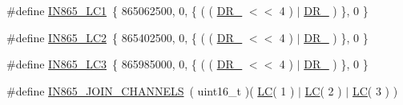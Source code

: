 \begin{DoxyCompactItemize}
\#define \mbox{\hyperlink{group___r_e_g_i_o_n_i_n865_gab2e4ff59116b5b7ea17b56379b9b1fbc}{I\+N865\+\_\+\+L\+C1}}~\{ 865062500, 0, \{ ( ( \mbox{\hyperlink{group___r_e_g_i_o_n_ga872e12c82020c02a7f70a1c6ed1375df}{D\+R\+\_}} $<$$<$ 4 ) $\vert$ \mbox{\hyperlink{group___r_e_g_i_o_n_ga6c4ef966b4f3d5eb7597b087f2b97095}{D\+R\+\_}} ) \}, 0 \}
\item 
\#define \mbox{\hyperlink{group___r_e_g_i_o_n_i_n865_ga737c986f456a7cc50b7efcbae64da6a0}{I\+N865\+\_\+\+L\+C2}}~\{ 865402500, 0, \{ ( ( \mbox{\hyperlink{group___r_e_g_i_o_n_ga872e12c82020c02a7f70a1c6ed1375df}{D\+R\+\_}} $<$$<$ 4 ) $\vert$ \mbox{\hyperlink{group___r_e_g_i_o_n_ga6c4ef966b4f3d5eb7597b087f2b97095}{D\+R\+\_}} ) \}, 0 \}
\item 
\#define \mbox{\hyperlink{group___r_e_g_i_o_n_i_n865_ga6808f21aa6b28f6d31d32bc44c3ee52a}{I\+N865\+\_\+\+L\+C3}}~\{ 865985000, 0, \{ ( ( \mbox{\hyperlink{group___r_e_g_i_o_n_ga872e12c82020c02a7f70a1c6ed1375df}{D\+R\+\_}} $<$$<$ 4 ) $\vert$ \mbox{\hyperlink{group___r_e_g_i_o_n_ga6c4ef966b4f3d5eb7597b087f2b97095}{D\+R\+\_}} ) \}, 0 \}
\item 
\#define \mbox{\hyperlink{group___r_e_g_i_o_n_i_n865_ga61dadd0a86c40e6fd4d47ffb08a1305e}{I\+N865\+\_\+\+J\+O\+I\+N\+\_\+\+C\+H\+A\+N\+N\+E\+LS}}~( uint16\+\_\+t )( \mbox{\hyperlink{group___r_e_g_i_o_n_ga12fa17e5c1016e01a9d82c25027deb1b}{LC}}( 1 ) $\vert$ \mbox{\hyperlink{group___r_e_g_i_o_n_ga12fa17e5c1016e01a9d82c25027deb1b}{LC}}( 2 ) $\vert$ \mbox{\hyperlink{group___r_e_g_i_o_n_ga12fa17e5c1016e01a9d82c25027deb1b}{LC}}( 3 ) )
\end{DoxyCompactItemize}
